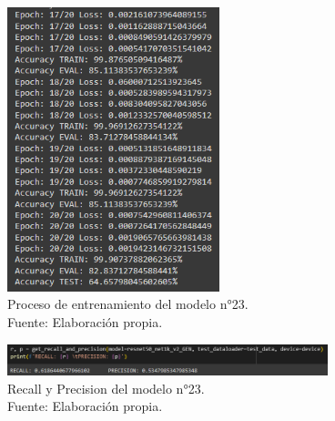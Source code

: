 \begin{figure}[H]
	\begin{center}
		\includegraphics[width=0.55\textwidth]{4/figures/model23_train.PNG}
		\caption[Proceso de entrenamiento del modelo n°23]{Proceso de entrenamiento del modelo n°23. \\
		Fuente: Elaboración propia.}
		\label{4:fig164}
	\end{center}
\end{figure}

\begin{figure}[H]
	\begin{center}
		\includegraphics[width=0.83\textwidth]{4/figures/model23_rp.PNG}
		\caption[Recall y Precision del modelo n°23]{Recall y Precision del modelo n°23. \\
		Fuente: Elaboración propia.}
		\label{4:fig165}
	\end{center}
\end{figure}

